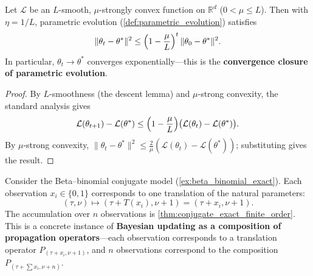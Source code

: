 \begin{theorem}\label{thm:parametric_evolution_closure}
Let $\mathcal{L}$ be an $L$-smooth, $\mu$-strongly convex function on $\mathbb{R}^d$ ($0<\mu\le L$). Then with $\eta = 1/L$, parametric evolution (\cref{def:parametric_evolution}) satisfies
\[
\|\theta_t - \theta^*\|^2 \le \Bigl(1-\frac{\mu}{L}\Bigr)^t\,\|\theta_0-\theta^*\|^2.
\]
In particular, $\theta_t\to\theta^*$ converges exponentially---this is the \textbf{convergence closure of parametric evolution}.
\end{theorem}

\begin{proof}
By $L$-smoothness (the descent lemma) and $\mu$-strong convexity, the standard analysis gives
\[
\mathcal{L}(\theta_{t+1}) - \mathcal{L}(\theta^*) \le \Bigl(1-\frac{\mu}{L}\Bigr)\bigl(\mathcal{L}(\theta_t)-\mathcal{L}(\theta^*)\bigr).
\]
By $\mu$-strong convexity, $\|\theta_t-\theta^*\|^2\le\frac{2}{\mu}(\mathcal{L}(\theta_t)-\mathcal{L}(\theta^*))$; substituting gives the result.
\end{proof}

\begin{example}\label{ex:sequential_bayesian_propagation}
Consider the Beta--binomial conjugate model (\cref{ex:beta_binomial_exact}). Each observation $x_i\in\{0,1\}$ corresponds to one translation of the natural parameters:
\[
(\tau,\nu)\mapsto(\tau + T(x_i),\nu+1) = (\tau+x_i,\nu+1).
\]
The accumulation over $n$ observations is \cref{thm:conjugate_exact_finite_order}. This is a concrete instance of \textbf{Bayesian updating as a composition of propagation operators}---each observation corresponds to a translation operator $P_{(\tau+x_i,\nu+1)}$, and $n$ observations correspond to the composition $P_{(\tau+\sum x_i,\nu+n)}$.
\end{example}

